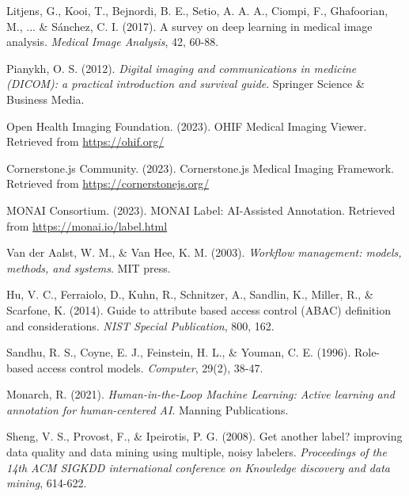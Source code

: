 \begin{thebibliography}{99}

Litjens, G., Kooi, T., Bejnordi, B. E., Setio, A. A. A., Ciompi, F., Ghafoorian, M., ... \& Sánchez, C. I. (2017). A survey on deep learning in medical image analysis. \emph{Medical Image Analysis}, 42, 60-88.

Pianykh, O. S. (2012). \emph{Digital imaging and communications in medicine (DICOM): a practical introduction and survival guide}. Springer Science \& Business Media.

Open Health Imaging Foundation. (2023). OHIF Medical Imaging Viewer. Retrieved from \url{https://ohif.org/}

Cornerstone.js Community. (2023). Cornerstone.js Medical Imaging Framework. Retrieved from \url{https://cornerstonejs.org/}

MONAI Consortium. (2023). MONAI Label: AI-Assisted Annotation. Retrieved from \url{https://monai.io/label.html}

Van der Aalst, W. M., \& Van Hee, K. M. (2003). \emph{Workflow management: models, methods, and systems}. MIT press.

Hu, V. C., Ferraiolo, D., Kuhn, R., Schnitzer, A., Sandlin, K., Miller, R., \& Scarfone, K. (2014). Guide to attribute based access control (ABAC) definition and considerations. \emph{NIST Special Publication}, 800, 162.

Sandhu, R. S., Coyne, E. J., Feinstein, H. L., \& Youman, C. E. (1996). Role-based access control models. \emph{Computer}, 29(2), 38-47.

Monarch, R. (2021). \emph{Human-in-the-Loop Machine Learning: Active learning and annotation for human-centered AI}. Manning Publications.

Sheng, V. S., Provost, F., \& Ipeirotis, P. G. (2008). Get another label? improving data quality and data mining using multiple, noisy labelers. \emph{Proceedings of the 14th ACM SIGKDD international conference on Knowledge discovery and data mining}, 614-622.

\end{thebibliography} 